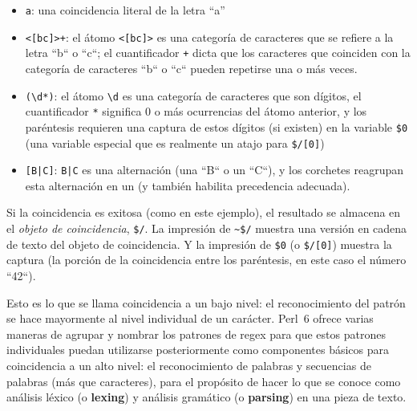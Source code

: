\begin{itemize}

\item \verb'a': una coincidencia literal de la letra ``a''

\item \verb'<[bc]>+': el átomo \verb'<[bc]>' es una categoría de caracteres
que se refiere a la letra ``b`` o ``c``; el cuantificador \verb|+|
dicta que los caracteres que coinciden con la categoría de caracteres
``b`` o ``c`` pueden repetirse una o más veces.

\item \verb'(\d*)': el átomo \verb|\d| es una categoría de caracteres
que son dígitos, el cuantificador \verb|*| significa 0 o más ocurrencias
del átomo anterior, y los paréntesis requieren una captura
de estos dígitos (si existen) en la variable \verb|$0| (una variable especial
que es realmente un atajo para \verb|$/[0]|)


\item \verb'[B|C]': \verb'B|C' es una alternación (una ``B`` o un ``C``),
y los corchetes reagrupan esta alternación en un (y también habilita 
precedencia adecuada).

\end{itemize}

Si la coincidencia es exitosa (como en este ejemplo), 
el resultado se almacena en el \emph{objeto de coincidencia},
\verb|$/|. La impresión de \verb|~$/| muestra una versión en
cadena de texto del objeto de coincidencia. Y la impresión de \verb|$0|
(o \verb|$/[0]|) muestra la captura (la porción de la coincidencia
entre los paréntesis, en este caso el número ``42``).

Esto es lo que se llama coincidencia a un bajo nivel:
el reconocimiento del patrón se hace mayormente al nivel
individual de un carácter. Perl~6 ofrece varias maneras de 
agrupar y nombrar los patrones de regex para que estos
patrones individuales puedan utilizarse posteriormente 
como componentes básicos para coincidencia a un alto nivel:
el reconocimiento de palabras y secuencias de palabras (más
que caracteres), para el propósito de hacer lo que se conoce
como análisis léxico (o {\bf lexing}) y análisis gramático
(o {\bf parsing}) en una pieza de texto.

